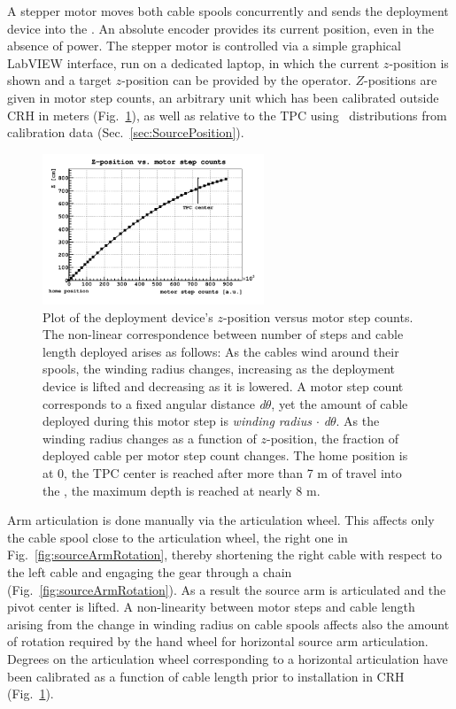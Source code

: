 A stepper motor moves both cable spools concurrently and sends the deployment device into the \lsv. An absolute encoder provides its current position, even in the absence of power. The stepper motor is controlled via a simple graphical LabVIEW interface, run on a dedicated laptop, in which the current $z$-position is shown and a target $z$-position can be provided by the operator. $Z$-positions are given in motor step counts, an arbitrary unit which has been calibrated outside CRH in meters (Fig.~\ref{fig:z_test}), as well as relative to the TPC using \tdrift\ distributions from calibration data (Sec.~\ref{sec:SourcePosition}).

\begin{figure}[htbp]
 \centering
 \includegraphics[width=0.59\textwidth]{Figures/MSC_Z}
 \caption{Plot of the deployment device's $z$-position versus motor step counts. The non-linear correspondence between number of steps and cable length deployed arises as follows: As the cables wind around their spools, the winding radius changes, increasing as the deployment device is lifted and decreasing as it is lowered. A motor step count corresponds to a fixed angular distance \textit{d$\theta$}, yet the amount of cable deployed during this motor step is \textit{winding radius $\cdot$ d$\theta$}. As the winding radius changes as a function of $z$-position, the fraction of deployed cable per motor step count changes. The home position is at 0, the TPC center is reached after more than 7 m of travel into the \lsv, the maximum depth is reached at nearly 8 m.}
 \label{fig:z_test}
\end{figure}

\label{sec:Nonlinearity:MotorStepCounts}
Arm articulation is done manually via the articulation wheel. This affects only the cable spool close to the articulation wheel, the right one in Fig.~\ref{fig:sourceArmRotation}, thereby shortening the right cable with respect to the left cable and engaging the gear through a chain (Fig.~\ref{fig:sourceArmRotation}). As a result the source arm is articulated and the pivot center is lifted. A non-linearity between motor steps and cable length arising from the change in winding radius on cable spools affects also the amount of rotation required by the hand wheel for horizontal source arm articulation.
Degrees on the articulation wheel corresponding to a horizontal articulation have been calibrated as a function of cable length prior to installation in CRH (Fig.~\ref{fig:z_test}).

